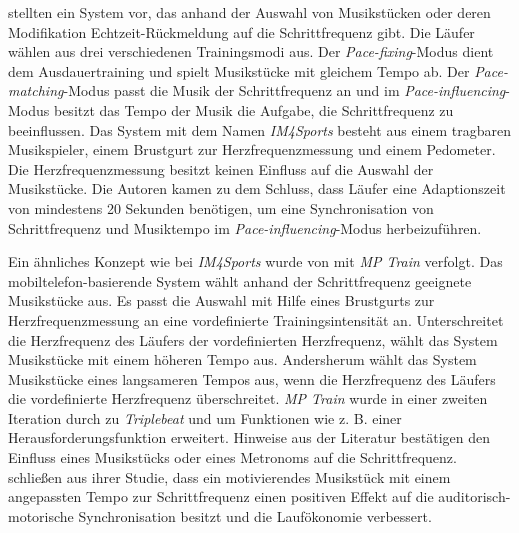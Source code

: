 \citet[][]{Wijnalda2005} stellten ein System vor, das anhand der Auswahl von Musikstücken oder deren Modifikation Echtzeit-Rückmeldung auf die Schrittfrequenz gibt. Die Läufer wählen aus drei verschiedenen Trainingsmodi aus. Der \emph{Pace-fixing}-Modus dient dem Ausdauertraining und spielt Musikstücke mit gleichem Tempo ab. Der \emph{Pace-matching}-Modus passt die Musik der Schrittfrequenz an und im \emph{Pace-influencing}-Modus besitzt das Tempo der Musik die Aufgabe, die Schrittfrequenz zu beeinflussen. Das System mit dem Namen \emph{IM4Sports} besteht aus einem tragbaren Musikspieler, einem Brustgurt zur Herzfrequenzmessung und einem Pedometer. Die Herzfrequenzmessung besitzt keinen Einfluss auf die Auswahl der Musikstücke. Die Autoren kamen zu dem Schluss, dass Läufer eine Adaptionszeit von mindestens 20 Sekunden benötigen, um eine Synchronisation von Schrittfrequenz und Musiktempo im \emph{Pace-influencing}-Modus herbeizuführen.

Ein ähnliches Konzept wie bei \emph{IM4Sports} wurde von \citet[][]{Oliver2006} mit \emph{MP Train} verfolgt. Das mobiltelefon-basierende System wählt anhand der Schrittfrequenz geeignete Musikstücke aus. Es passt die Auswahl mit Hilfe eines Brustgurts zur Herzfrequenzmessung an eine vordefinierte Trainingsintensität an. Unterschreitet die Herzfrequenz des Läufers der vordefinierten Herzfrequenz, wählt das System Musikstücke mit einem höheren Tempo aus. Andersherum wählt das System Musikstücke eines langsameren Tempos aus, wenn die Herzfrequenz des Läufers die vordefinierte Herzfrequenz überschreitet. \emph{MP Train} wurde in einer zweiten Iteration durch \citet[][]{DeOliveira2008} zu \emph{Triplebeat} und um Funktionen wie z. B. einer Herausforderungsfunktion erweitert. Hinweise aus der Literatur \citep[z. B.][]{Bood2013} bestätigen den Einfluss eines Musikstücks oder eines Metronoms auf die Schrittfrequenz. \citet[][]{Bood2013} schließen aus ihrer Studie, dass ein motivierendes Musikstück mit einem angepassten Tempo zur Schrittfrequenz einen positiven Effekt auf die auditorisch-motorische Synchronisation besitzt und die Laufökonomie verbessert.


